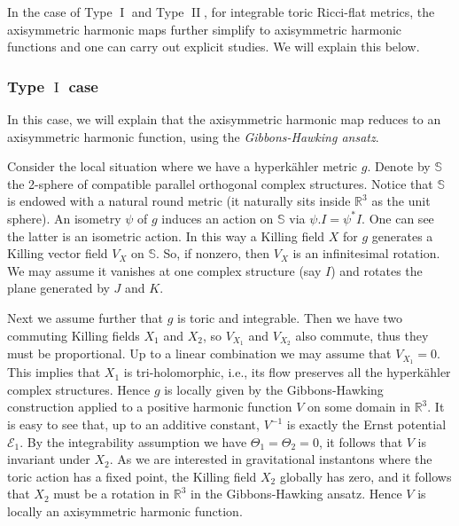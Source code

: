 \documentclass[a4paper,11pt]{amsart}
\theoremstyle{definition}
\numberwithin{equation}{section}
\newcommand{\R}{\mathbb{R}}
\DeclareMathOperator{\I}{I}
\DeclareMathOperator{\II}{II}
\begin{document}
In the case of Type $\I$ and Type $\II$, for integrable toric Ricci-flat metrics, the axisymmetric harmonic maps further simplify to axisymmetric harmonic functions and  one can carry out explicit studies. We will explain this below.






\subsubsection{Type $\I$ case} 
\label{subsubsec:Type I case}

In this case, we will explain that the axisymmetric harmonic map reduces to an axisymmetric harmonic function, using the \emph{Gibbons-Hawking ansatz}.

Consider the local situation where we have a hyperk\"ahler metric $g$. Denote by $\mathbb S$ the 2-sphere of compatible parallel orthogonal complex structures. Notice that $\mathbb S$ is endowed with a natural round metric (it naturally sits inside $\R^3$ as the unit sphere). An isometry $\psi$ of $g$ induces an action on $\mathbb S$ via $\psi. I=\psi^*I$. One can see the latter is an isometric action.  In this way a Killing field $X$ for $g$ generates a Killing vector field $V_X$ on $\mathbb S$.  So, if nonzero, then $V_X$ is an infinitesimal rotation. We may assume it vanishes at one complex structure (say $I$) and rotates the plane generated by $J$ and $K$. 

Next we assume further that $g$ is toric and integrable.  Then we have two commuting Killing fields $X_1$ and $X_2$, so $V_{X_1}$ and $V_{X_2}$ also commute, thus they must be proportional. Up to a linear combination we may assume that $V_{X_1}=0$. This implies that $X_1$ is tri-holomorphic, i.e., its flow preserves all the hyperk\"ahler complex structures. Hence $g$ is locally given by the Gibbons-Hawking construction applied to a positive harmonic function $V$ on some domain in $\R^3$. It is easy to see that, up to an additive constant, $V^{-1}$ is exactly the Ernst potential $\mathcal{E}_1$. By the integrability assumption we have $\Theta_1=\Theta_2=0$, it follows that $V$ is invariant under $X_2$. As we are interested in gravitational instantons where the toric action has a fixed point, the Killing field $X_2$ globally has zero, and it follows that $X_2$ must be a rotation in $\mathbb R^3$ in the Gibbons-Hawking ansatz. Hence $V$ is locally an axisymmetric harmonic function. 
\end{document}
